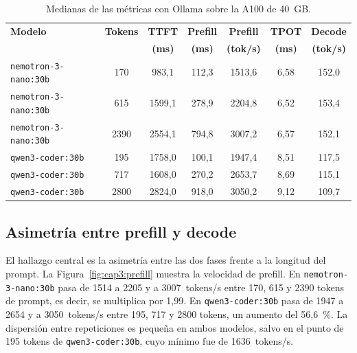\begin{table}[!hbp]
  \centering
  \caption{Medianas de las métricas con Ollama sobre la A100 de 40~GB.}
  \label{tab:cap3:ollama}
  \footnotesize
  \setlength{\tabcolsep}{4pt}
  \begin{tabular}{|l|c|c|c|c|c|c|}
    \hline
    \textbf{Modelo} & \textbf{Tokens} & \textbf{TTFT} & \textbf{Prefill} & \textbf{Prefill} & \textbf{TPOT} & \textbf{Decode} \\
     & & \textbf{(ms)} & \textbf{(ms)} & \textbf{(tok/s)} & \textbf{(ms)} & \textbf{(tok/s)} \\
    \hline
    \texttt{nemotron-3-\allowbreak nano:\allowbreak 30b} & 170 & 983,1 & 112,3 & 1513,6 & 6,58 & 152,0 \\
    \hline
    \texttt{nemotron-3-\allowbreak nano:\allowbreak 30b} & 615 & 1599,1 & 278,9 & 2204,8 & 6,52 & 153,4 \\
    \hline
    \texttt{nemotron-3-\allowbreak nano:\allowbreak 30b} & 2390 & 2554,1 & 794,8 & 3007,2 & 6,57 & 152,1 \\
    \hline
    \texttt{qwen3-\allowbreak coder:\allowbreak 30b} & 195 & 1758,0 & 100,1 & 1947,4 & 8,51 & 117,5 \\
    \hline
    \texttt{qwen3-\allowbreak coder:\allowbreak 30b} & 717 & 1608,0 & 270,2 & 2653,7 & 8,69 & 115,1 \\
    \hline
    \texttt{qwen3-\allowbreak coder:\allowbreak 30b} & 2800 & 2824,0 & 918,0 & 3050,2 & 9,12 & 109,7 \\
    \hline
  \end{tabular}
\end{table}

\subsection{Asimetría entre prefill y decode}
\label{sec:cap3:asimetria}

El hallazgo central es la asimetría entre las dos fases frente a la longitud del prompt. La Figura~\ref{fig:cap3:prefill} muestra la velocidad de prefill. En \texttt{nemotron-3-\allowbreak nano:\allowbreak 30b} pasa de 1514 a 2205 y a 3007~tokens/s entre 170, 615 y 2390 tokens de prompt, es decir, se multiplica por 1,99. En \texttt{qwen3-\allowbreak coder:\allowbreak 30b} pasa de 1947 a 2654 y a 3050~tokens/s entre 195, 717 y 2800 tokens, un aumento del 56,6~\%. La dispersión entre repeticiones es pequeña en ambos modelos, salvo en el punto de 195 tokens de \texttt{qwen3-\allowbreak coder:\allowbreak 30b}, cuyo mínimo fue de 1636~tokens/s.

